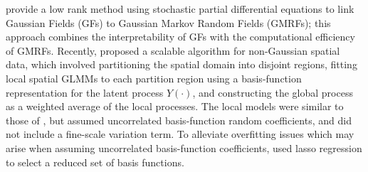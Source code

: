 \documentclass[12pt,a4paper]{article}
\begin{document}
\cite{Lindgren_Rue_2011_GF_GMRF_SPDE} provide a low rank method using stochastic partial differential equations to link Gaussian Fields (GFs) to Gaussian Markov Random Fields (GMRFs); this approach combines the interpretability of GFs with the computational efficiency of GMRFs.
Recently, \cite{Lee_2020_partitioned_domain_basis_function_non_Gaussian} proposed a scalable algorithm  for non-Gaussian spatial data, which involved partitioning the spatial domain into disjoint regions, fitting local spatial GLMMs to each partition region using a basis-function representation for the latent process $Y(\cdot)$, and constructing the global process as a weighted average of the local processes. 
The local models were similar to those of \cite{Sengupta_Cressie_2013_spatial_GLMM_FRK}, but assumed uncorrelated basis-function random coefficients, and did not include a fine-scale variation term. 
To alleviate overfitting issues which may arise when assuming uncorrelated basis-function coefficients, \cite{Lee_2020_partitioned_domain_basis_function_non_Gaussian} used lasso regression to select a reduced set of basis functions.
\end{document}
